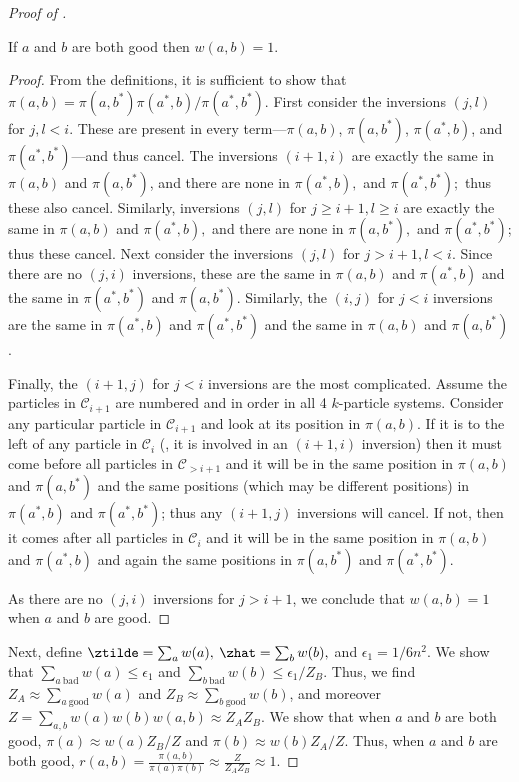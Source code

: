 \begin{proof}[Proof of ]
\begin{lemma}\label{lem:good}
If $a$ and $b$ are both good then $w(a,b) = 1.$
\end{lemma}
\begin{proof}  
From the definitions, it is sufficient to show that $\pi(a,b) = 
\pi(a,b^*)\pi(a^*,b)/\pi(a^*,b^*).$ First consider the inversions 
$(j,l)$ for $j,l<i$.  These are present in every term---$\pi(a,b)$, 
$\pi(a,b^*)$, $\pi(a^*,b)$, and $\pi(a^*,b^*)$---and thus cancel. The 
inversions $(i+1,i)$ are exactly the same in $\pi(a,b)$ and 
$\pi(a,b^*)$, and there are none in $\pi(a^*,b),$ and $\pi(a^*,b^*);$ 
thus these also cancel.  Similarly, inversions $(j,l)$ for  $j\geq i+1,l 
\geq i$ are exactly the same in $\pi(a,b)$ and $\pi(a^*,b),$ and there 
are none in $\pi(a,b^*),$ and $\pi(a^*,b^*)$; thus these cancel. 
Next consider the inversions $(j,l)$ for  $j>i+1,l < i$.  Since there 
are no $(j,i)$ inversions, these are the same in $\pi(a,b)$ and 
$\pi(a^*,b)$ and the same in $\pi(a^*,b^*)$ and $\pi(a, b^*).$ 
Similarly, the $(i,j)$ for $j < i$ inversions are the same in 
$\pi(a^*,b)$ and $\pi(a^*,b^*)$ and the same in $\pi(a,b)$ and 
$\pi(a,b^*)$.  

Finally, the $(i+1,j)$ for $j<i$ inversions are the most complicated. 
Assume the particles in $\mathcal{C}_{i+1}$ are numbered and in order 
in all 4 $k$-particle systems.  Consider any particular particle in 
$\mathcal{C}_{i+1}$ and look at its position in $\pi(a,b)$.  If it is 
to the left of any particle in $\mathcal{C}_{i}$ (\ie,  it is involved 
in an $(i+1,i)$ inversion) then it must come before all particles in 
$\mathcal{C}_{> i+1}$ and it will be in the same position in $\pi(a,b)$ 
and $\pi(a,b^*)$ and the same positions (which may be different 
positions) in $\pi(a^*,b)$ and $\pi(a^*,b^*)$; thus any $(i+1,j)$ 
inversions will cancel.  If not, then it comes after all particles in 
$\mathcal{C}_{i}$ and it will be in the same position in $\pi(a,b)$ and 
$\pi(a^*,b)$ and again the same positions in $\pi(a,b^*)$ and 
$\pi(a^*,b^*)$.  

As there are no $(j,i)$ inversions for $j > i+1$, we conclude 
that $w(a,b) = 1$ when $a$ and $b$ are good. 
\end{proof}

Next, define $\ztilde =  \sum_{a} w(a),$  $\zhat =\sum_{b}w(b),$ and 
$\epsilon_1= 1/6n^2$. We show that $\sum_{a~\text{bad}}w(a)\leq 
\epsilon_1$ and $\sum_{b~\text{bad}}w(b)\leq \epsilon_1/Z_B$.  Thus, we 
find $Z_A\approx \sum_{a~\text{good}}  w(a)$ and $Z_B \approx 
\sum_{b~\text{good}}  w(b)$, and moreover 
$Z=\sum_{a,b}w(a)w(b)w(a,b)\approx Z_AZ_B.$ We show that when $a$ and 
$b$ are both good, $\pi(a)\approx w(a)Z_B/Z$ and $\pi(b)\approx 
w(b)Z_A/Z$.  Thus, when $a$ and $b$ are both good, $r(a,b) = 
\frac{\pi(a,b)}{\pi(a)\pi(b)} \approx \frac{Z}{Z_AZ_B}\approx 1.$


\end{proof}
